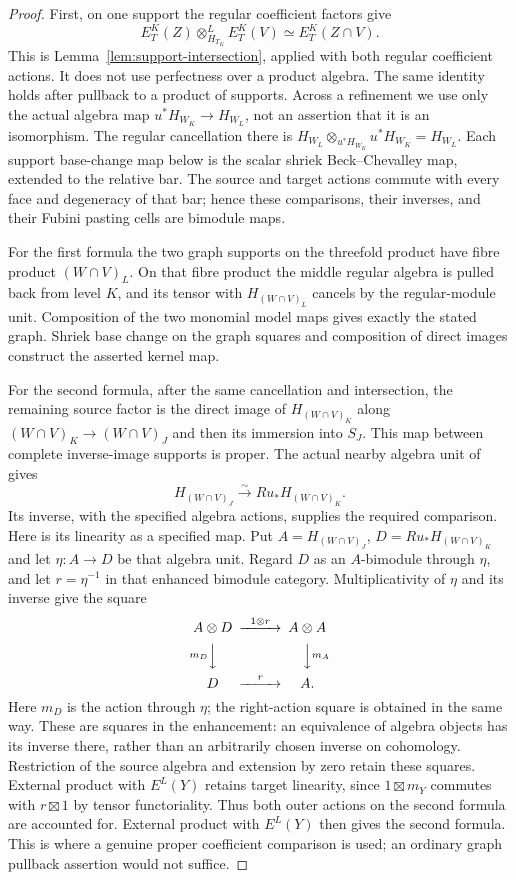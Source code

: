 \documentclass[11pt]{article}
\theoremstyle{definition}
\theoremstyle{remark}
\begin{document}
\begin{proof}
First, on one support the regular coefficient factors give
\[
 E_T^K(Z)\otimes_{H_{T_K}}^L E_T^K(V)
             \simeq E_T^K(Z\cap V).
\]
This is Lemma~\ref{lem:support-intersection}, applied with both
regular coefficient actions.  It does not use perfectness over a product algebra.
The same identity holds after pullback to a product of supports.
Across a refinement we use only the actual algebra map
$u^*H_{W_K}\to H_{W_L}$, not an assertion that it is an
isomorphism.  The regular cancellation there is
$H_{W_L}\otimes_{u^*H_{W_K}}u^*H_{W_K}=H_{W_L}$.
Each support base-change map below is the scalar shriek
Beck--Chevalley map, extended to the relative bar.  The source
and target actions commute with every face and degeneracy of that
bar; hence these comparisons, their inverses, and their Fubini
pasting cells are bimodule maps.

For the first formula the two graph supports on the threefold
product have fibre product $(W\cap V)_L$.  On that fibre product the
middle regular algebra is pulled back from level $K$, and its tensor
with $H_{(W\cap V)_L}$ cancels by the regular-module unit.  Composition
of the two monomial model maps gives exactly the stated graph.
Shriek base change on the graph squares and composition of direct
images construct the asserted kernel map.

For the second formula, after the same cancellation and intersection,
the remaining source factor is the direct image of
$H_{(W\cap V)_K}$ along
$(W\cap V)_K\to(W\cap V)_J$ and then its immersion into $S_J$.
This map between complete inverse-image supports is proper.  The
actual nearby algebra unit of \cite{Refinement} gives
\[
 H_{(W\cap V)_J}\xrightarrow{\sim}
 Ru_*H_{(W\cap V)_K}.
\]
Its inverse, with the specified algebra actions, supplies the required
comparison.  Here is its linearity as a specified map.  Put
$A=H_{(W\cap V)_J}$, $D=Ru_*H_{(W\cap V)_K}$ and let
$\eta:A\to D$ be that algebra unit.  Regard $D$ as an $A$-bimodule
through $\eta$, and let $r=\eta^{-1}$ in that enhanced bimodule
category.  Multiplicativity of $\eta$ and its inverse give the square
\begin{equation}
\begin{CD}
 A\otimes D @>{1\otimes r}>> A\otimes A\\
 @V{m_D}VV @VV{m_A}V\\
 D @>{r}>> A .
\end{CD}
\label{eq:rectangle-graph-linearity}
\end{equation}
Here $m_D$ is the action through $\eta$; the right-action square is
obtained in the same way.  These are squares in the enhancement:
an equivalence of algebra objects has its inverse there, rather
than an arbitrarily chosen inverse on cohomology.  Restriction of
the source algebra and extension by zero retain these squares.
External product with $E^L(Y)$ retains target linearity, since
$1\boxtimes m_Y$ commutes with $r\boxtimes1$ by tensor functoriality.
Thus both outer actions on the second formula are accounted for.
External product with $E^L(Y)$ then gives the second formula.  This is where a genuine proper coefficient comparison is
used; an ordinary graph pullback assertion would not suffice.


\end{proof}
\end{document}
